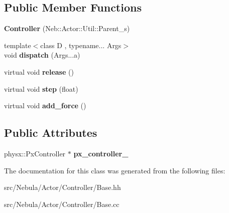 \subsection*{\-Public \-Member \-Functions}
\begin{DoxyCompactItemize}
\item 
\hypertarget{classNeb_1_1Actor_1_1Controller_af5e1a68f2a9f3613beebdaad7ae15457}{{\bfseries \-Controller} (\-Neb\-::\-Actor\-::\-Util\-::\-Parent\-\_\-s)}\label{classNeb_1_1Actor_1_1Controller_af5e1a68f2a9f3613beebdaad7ae15457}

\item 
\hypertarget{classNeb_1_1Actor_1_1Controller_ad63d00b7429451a720eca67012d4c1b3}{{\footnotesize template$<$class D , typename... \-Args$>$ }\\void {\bfseries dispatch} (\-Args...\-a)}\label{classNeb_1_1Actor_1_1Controller_ad63d00b7429451a720eca67012d4c1b3}

\item 
\hypertarget{classNeb_1_1Actor_1_1Controller_a4cf7cbd70138ea33c509d89ebc74e45d}{virtual void {\bfseries release} ()}\label{classNeb_1_1Actor_1_1Controller_a4cf7cbd70138ea33c509d89ebc74e45d}

\item 
\hypertarget{classNeb_1_1Actor_1_1Controller_a37d671a837e578ee05e2f9e1a5292e79}{virtual void {\bfseries step} (float)}\label{classNeb_1_1Actor_1_1Controller_a37d671a837e578ee05e2f9e1a5292e79}

\item 
\hypertarget{classNeb_1_1Actor_1_1Controller_aed64790b9ac840ebb4e6da3af3a6e405}{virtual void {\bfseries add\-\_\-force} ()}\label{classNeb_1_1Actor_1_1Controller_aed64790b9ac840ebb4e6da3af3a6e405}

\end{DoxyCompactItemize}
\subsection*{\-Public \-Attributes}
\begin{DoxyCompactItemize}
\item 
\hypertarget{classNeb_1_1Actor_1_1Controller_a488fba03acad68f997a3f38f4fac41fd}{physx\-::\-Px\-Controller $\ast$ {\bfseries px\-\_\-controller\-\_\-}}\label{classNeb_1_1Actor_1_1Controller_a488fba03acad68f997a3f38f4fac41fd}

\end{DoxyCompactItemize}


\-The documentation for this class was generated from the following files\-:\begin{DoxyCompactItemize}
\item 
src/\-Nebula/\-Actor/\-Controller/\-Base.\-hh\item 
src/\-Nebula/\-Actor/\-Controller/\-Base.\-cc\end{DoxyCompactItemize}
